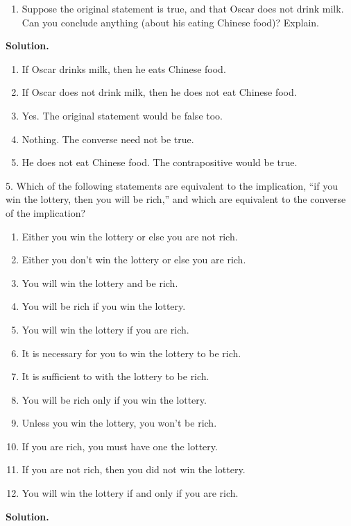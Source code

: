\documentclass[10pt,]{book}
\theoremstyle{plain}
\theoremstyle{definition}
\theoremstyle{definition}
\theoremstyle{definition}
\begin{document}
\begin{exerciselist}
\begin{enumerate}[label=(\alph*)]
\item\hypertarget{li-97}{} Suppose the original statement is true, and that Oscar does not drink milk. Can you conclude anything (about his eating Chinese food)? Explain. %
\end{enumerate}
\par\smallskip
\par\smallskip
\noindent\textbf{Solution.}\hypertarget{solution-10}{}\quad
\leavevmode%
\begin{enumerate}[label=(\alph*)]
\item\hypertarget{li-98}{} If Oscar drinks milk, then he eats Chinese food. %
\item\hypertarget{li-99}{} If Oscar does not drink milk, then he does not eat Chinese food. %
\item\hypertarget{li-100}{} Yes. The original statement would be false too. %
\item\hypertarget{li-101}{} Nothing. The converse need not be true. %
\item\hypertarget{li-102}{} He does not eat Chinese food. The contrapositive would be true. %
\end{enumerate}
\item[5.]\hypertarget{exercise-5}{}
          Which of the following statements are equivalent to the implication, ``if you win the lottery, then you will be rich,'' and which are equivalent to the converse of the implication?
\leavevmode%
\begin{enumerate}[label=(\alph*)]
\item\hypertarget{li-103}{} Either you win the lottery or else you are not rich. %
\item\hypertarget{li-104}{} Either you don't win the lottery or else you are rich. %
\item\hypertarget{li-105}{} You will win the lottery and be rich. %
\item\hypertarget{li-106}{} You will be rich if you win the lottery. %
\item\hypertarget{li-107}{} You will win the lottery if you are rich. %
\item\hypertarget{li-108}{} It is necessary for you to win the lottery to be rich. %
\item\hypertarget{li-109}{} It is sufficient to with the lottery to be rich. %
\item\hypertarget{li-110}{} You will be rich only if you win the lottery. %
\item\hypertarget{li-111}{} Unless you win the lottery, you won't be rich. %
\item\hypertarget{li-112}{} If you are rich, you must have one the lottery. %
\item\hypertarget{li-113}{} If you are not rich, then you did not win the lottery. %
\item\hypertarget{li-114}{} You will win the lottery if and only if you are rich. %
\end{enumerate}
\par\smallskip
\par\smallskip
\noindent\textbf{Solution.}\hypertarget{solution-11}{}\quad


\end{exerciselist}
\end{document}
